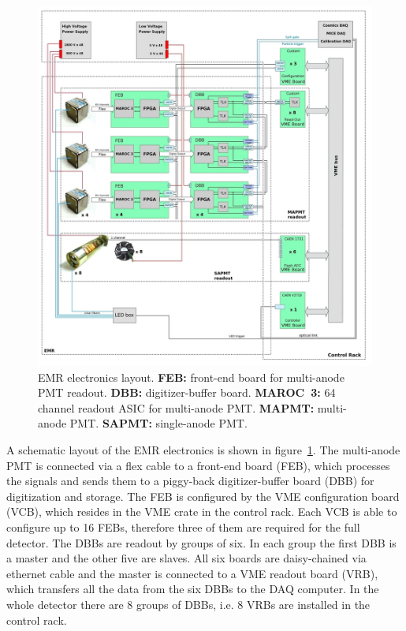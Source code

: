 \documentclass[a4paper,11pt]{article}
\begin{document}
\begin{figure}
 \centering
 \includegraphics[width=.99\textwidth]{./EMR_electronics_layout}
 \caption[EMR electronics layout.]{EMR electronics layout. {\bf FEB:} front-end board for multi-anode PMT readout. {\bf DBB:} digitizer-buffer
 board. {\bf MAROC~3:} 64 channel readout ASIC for multi-anode PMT. {\bf MAPMT:} multi-anode PMT. {\bf SAPMT:} single-anode PMT.}
 \label{fig:EMR_electronics_layout}
\end{figure}

A schematic layout of the EMR electronics is shown in figure~\ref{fig:EMR_electronics_layout}. The multi-anode PMT is connected via a flex cable
to a front-end board (FEB), which processes the signals and sends them to a piggy-back digitizer-buffer board (DBB) for digitization and storage.
The FEB is configured by the VME configuration board (VCB), which resides in the VME crate in the control rack. Each VCB is able to configure
up to 16 FEBs, therefore three of them are required for the full detector. The DBBs are readout by groups of six. In each group the first DBB
is a master and the other five are slaves. All six boards are daisy-chained via ethernet cable and the master is connected to a VME readout board
(VRB), which transfers all the data from the six DBBs to the DAQ computer. In the whole detector there are 8 groups of DBBs, i.e. 8 VRBs are
installed in the control rack. 
\end{document}
